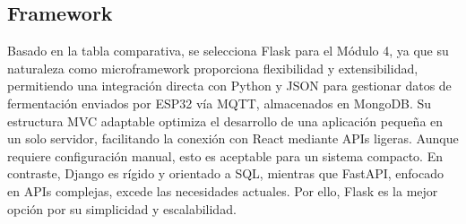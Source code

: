 \subsection{Framework}
Basado en la tabla comparativa, se selecciona Flask para el Módulo 4, 
ya que su naturaleza como microframework proporciona flexibilidad y extensibilidad,
permitiendo una integración directa con Python y JSON para gestionar datos de fermentación
enviados por ESP32 vía MQTT, almacenados en MongoDB. Su estructura MVC adaptable optimiza 
el desarrollo de una aplicación pequeña en un solo servidor, facilitando la conexión con React 
mediante APIs ligeras. Aunque requiere configuración manual, esto es aceptable para un sistema compacto. 
En contraste, Django es rígido y orientado a SQL, mientras que FastAPI, enfocado en APIs complejas, excede 
las necesidades actuales. Por ello, Flask es la mejor opción por su simplicidad y escalabilidad.
\caption{Comparación de Frameworks para el módulo 4.}
\label{tab:frameworks}
\begingroup
\centering
\small %

